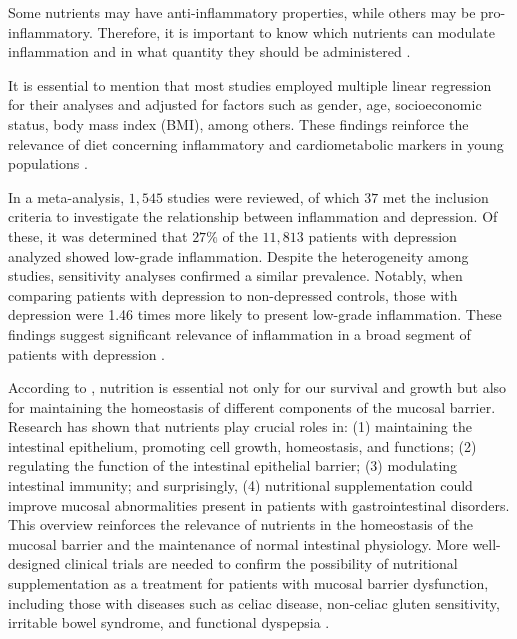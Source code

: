 \documentclass[jou]{apa7}
\begin{document}
Some nutrients may have anti-inflammatory properties, while others may be pro-inflammatory. Therefore, it is important to know which nutrients can modulate inflammation and in what quantity they should be administered \parencite{giuglianoMetabolicCardiovascularEffects1997}.

It is essential to mention that most studies employed multiple linear regression for their analyses and adjusted for factors such as gender, age, socioeconomic status, body mass index (BMI), among others. These findings reinforce the relevance of diet concerning inflammatory and cardiometabolic markers in young populations \parencite{cotaCardiometabolicRiskHealth2021}.

In a meta-analysis, $1,545$ studies were reviewed, of which $37$ met the inclusion criteria to investigate the relationship between inflammation and depression. Of these, it was determined that $27\%$ of the $11,813$ patients with depression analyzed showed low-grade inflammation. Despite the heterogeneity among studies, sensitivity analyses confirmed a similar prevalence. Notably, when comparing patients with depression to non-depressed controls, those with depression were 1.46 times more likely to present low-grade inflammation. These findings suggest significant relevance of inflammation in a broad segment of patients with depression \parencite{Osimo2019}.

According to \parencite{Farre2020}, nutrition is essential not only for our survival and growth but also for maintaining the homeostasis of different components of the mucosal barrier. Research has shown that nutrients play crucial roles in: (1) maintaining the intestinal epithelium, promoting cell growth, homeostasis, and functions; (2) regulating the function of the intestinal epithelial barrier; (3) modulating intestinal immunity; and surprisingly, (4) nutritional supplementation could improve mucosal abnormalities present in patients with gastrointestinal disorders.\\

This overview reinforces the relevance of nutrients in the homeostasis of the mucosal barrier and the maintenance of normal intestinal physiology. More well-designed clinical trials are needed to confirm the possibility of nutritional supplementation as a treatment for patients with mucosal barrier dysfunction, including those with diseases such as celiac disease, non-celiac gluten sensitivity, irritable bowel syndrome, and functional dyspepsia \parencite{Farre2020}.
\end{document}
